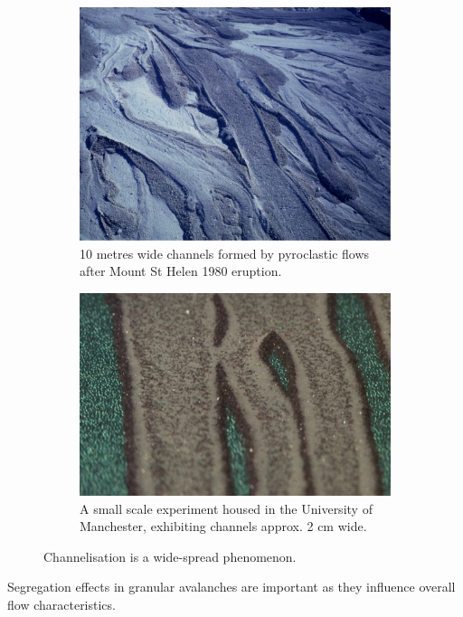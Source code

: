 


\begin{figure}[htp]
\centering
\begin{subfigure}{.5\textwidth}
  \centering
  \includegraphics[width=.8\linewidth]{images/st_helen}
  \caption{10 metres wide channels formed by pyroclastic flows after Mount St Helen 1980 eruption.}
  \label{fig:st_helen}
\end{subfigure}%
\begin{subfigure}{.5\textwidth}
  \centering
  \includegraphics[width=.92\linewidth]{images/small_scale}
  \caption{A small scale experiment housed in the University of Manchester, exhibiting channels approx. 2 cm wide.}
  \label{fig:small_scale}
\end{subfigure}
\caption{Channelisation is a wide-spread phenomenon.}
\label{fig:test}
\end{figure}

Segregation effects in granular avalanches are important as they influence overall flow characteristics. 

